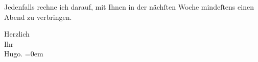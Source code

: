 \pstart
           {\pb}Jedenfalls rechne ich darauf, mit
               Ihnen in der nächſten Woche mindeſtens einen Abend zu verbringen.\pend
           
\pstart
           Herzlich{\\[\baselineskip]} Ihr{\\[\baselineskip]}\spacefill\mbox{Hugo.}\pend
           \leftskip=0em{}\endnumbering{}  \newcommand{\dateiname}{L00434}\newcommand{\titel}{Hugo von Hofmannsthal an Arthur Schnitzler, [28. 4. 1895]}\newcommand{\editorInnen}{Martin Anton Müller und Gerd-Hermann Susen}
